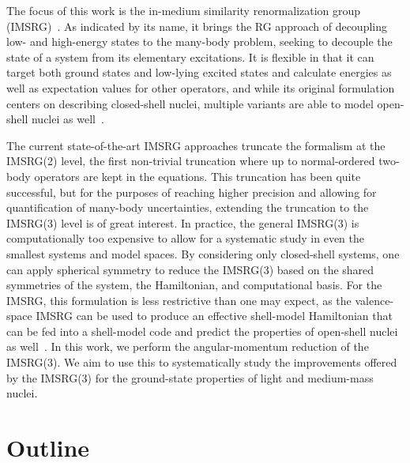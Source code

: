 The focus of this work is the in-medium similarity renormalization group (IMSRG)~\cite{Tsuk10imsrg}.
As indicated by its name,
it brings the RG approach of decoupling low- and high-energy states to the many-body problem,
seeking to decouple the state of a system from its elementary excitations.
It is flexible in that it can target both ground states and low-lying excited states
and calculate energies as well as expectation values for other operators,
and while its original formulation centers on describing closed-shell nuclei,
multiple variants are able to model open-shell nuclei
as well~\cite{Stro16vsimsrg,Bogn14vsimsrg,Herg2013mrimsrg,Gebr2016imncsm,Yao18imgcm}.

The current state-of-the-art IMSRG approaches truncate the formalism at the IMSRG(2) level,
the first non-trivial truncation where up to normal-ordered two-body operators are kept in the equations.
This truncation has been quite successful,
but for the purposes of reaching higher precision and allowing for quantification
of many-body uncertainties,
extending the truncation to the IMSRG(3) level is of great interest.
In practice, the general IMSRG(3) is computationally too expensive to allow for
a systematic study in even the smallest systems and model spaces.
By considering only closed-shell systems,
one can apply spherical symmetry to reduce the IMSRG(3)
based on the shared symmetries of the system, the Hamiltonian, and computational basis.
For the IMSRG, this formulation is less restrictive than one may expect,
as the valence-space IMSRG can be used to produce an effective shell-model Hamiltonian
that can be fed into a shell-model code and predict the properties of open-shell nuclei
as well~\cite{Bogn14vsimsrg,Stro16vsimsrg,Holt19vsimsrg_range}.
In this work, we perform the angular-momentum reduction of the IMSRG(3).
We aim to use this to systematically study the improvements offered by the IMSRG(3)
for the ground-state properties of light and medium-mass nuclei.

\section{Outline}

